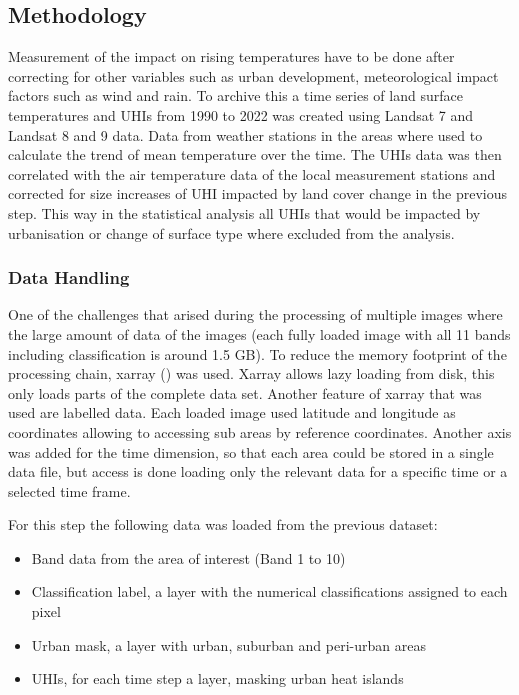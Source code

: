 \documentclass[12pt,a4paper, english,twoside]{article}
\begin{document}
    \subsection{Methodology}
      Measurement of the impact on rising temperatures have to be done after correcting for other variables such as urban development, meteorological impact factors such as wind and rain. 
      To archive this a time series of land surface temperatures and \glspl{UHI} from 1990 to 2022 was created using Landsat 7 and Landsat 8 and 9 data.
      Data from weather stations in the areas where used to calculate the trend of mean temperature over the time. 
      The \glspl{UHI} data was then correlated with the air temperature data of the local measurement stations and corrected for size increases of \gls{UHI} impacted by land cover change in the previous step. 
      This way in the statistical analysis all \glspl{UHI} that would be impacted by urbanisation or change of surface type where excluded from the analysis.
    \subsubsection{Data Handling}
      One of the challenges that arised during the processing of multiple images where the large amount of data of the images (each fully loaded image with all 11 bands including classification is around 1.5 GB).
      To reduce the memory footprint of the processing chain, xarray (\autocite{hoyer2017xarray}) was used. 
      Xarray allows lazy loading from disk, this only loads parts of the complete data set. 
      Another feature of xarray that was used are labelled data. Each loaded image used latitude and longitude as coordinates allowing to accessing sub areas by reference coordinates. 
      Another axis was added for the time dimension, so that each area could be stored in a single data file, but access is done loading only the relevant data for a specific time or a selected time frame.
  
      For this step the following data was loaded from the previous dataset: 
      \begin{itemize}
        \item Band data from the area of interest (Band 1 to 10)
        \item Classification label, a layer with the numerical classifications assigned to each pixel 
        \item Urban mask, a layer with urban, suburban and peri-urban areas
        \item \glspl{UHI}, for each time step a layer, masking urban heat islands
      \end{itemize}
\end{document}

